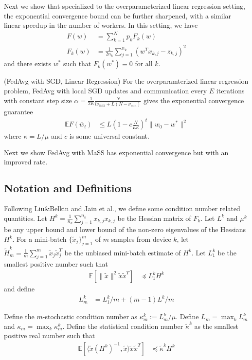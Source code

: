 Next we show that specialized to the overparameterized linear regression
setting, the exponential convergence bound can be further sharpened,
with a similar linear speedup in the number of workers. In this setting,
we have 
\begin{align*}
F(w) & =\sum_{k=1}^{N}p_{k}F_{k}(w)\\
F_{k}(w) & =\frac{1}{2n_{k}}\sum_{j=1}^{n_{k}}(w^{T}x_{k,j}-z_{k,j})^{2}
\end{align*}
and there exists $w^{\ast}$ such that $F_{k}(w^{\ast})\equiv0$
for all $k$. 
\begin{theorem}
	(FedAvg with SGD, Linear Regression) For the overparamterized linear
	regression problem, FedAvg with local SGD updates and communication
	every $E$ iterations with constant step size $\overline{\alpha}=\frac{1}{2E}\frac{N}{l\nu_{\max}+L(N-\nu_{\min})}$
	gives the exponential convergence guarantee 
	\begin{align*}
	\mathbb{E}F(\overline{w}_{t}) & \leq L(1-c\frac{N}{E\kappa})^{t}\|w_{0}-w^{\ast}\|^{2}
	\end{align*}
	where $\kappa=L/\mu$ and $c$ is some universal constant. 
\end{theorem}

Next we show FedAvg with MaSS has exponential convergence but with an improved rate. 

\subsection{Notation and Definitions}

Following Liu\&Belkin and Jain et al., we define some condition number
related quantities. Let $H^{k}=\frac{1}{n_{k}}\sum_{j=1}^{n_{k}}x_{k,j}x_{k,j}$
be the Hessian matrix of $F_{k}$. Let $L^{k}$ and $\mu^{k}$ be
any upper bound and lower bound of the non-zero eigenvalues of the
Hessians $H^{k}$. For a mini-batch $\{\tilde{x}_{j}\}_{j=1}^{m}$
of $m$ samples from device $k$, let $\tilde{H}_{m}^{k}=\frac{1}{m}\sum_{j=1}^{m}\tilde{x}_{j}\tilde{x}_{j}^{T}$
be the unbiased mini-batch estimate of $H^{k}$. Let $L_{1}^{k}$
be the smallest positive number such that 
\begin{align*}
\mathbb{E}\left[\|\tilde{x}\|^{2}\tilde{x}\tilde{x}^{T}\right] & \preceq L_{1}^{k}H^{k}
\end{align*}
and define 
\begin{align*}
L_{m}^{k} & =L_{1}^{k}/m+(m-1)L^{k}/m
\end{align*}

Define the $m$-stochastic condition number as $\kappa_{m}^{k}:=L_{m}^{k}/\mu$.
Define $L_{m}=\max_{k}L_{m}^{k}$ and $\kappa_{m}=\max_{k}\kappa_{m}^{k}$.
Define the statistical condition number $\tilde{\kappa}^{k}$ as the
smallest positive real number such that 
\begin{align*}
\mathbb{E}\left[\langle\tilde{x}(H^{k})^{-1},\tilde{x}\rangle\tilde{x}\tilde{x}^{T}\right] & \preceq\tilde{\kappa}^{k}H^{k}
\end{align*}


